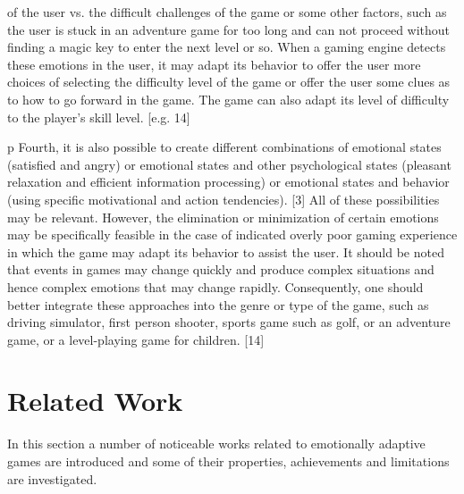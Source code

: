 of the user vs. the difficult challenges of the game or some other factors, such as the user is stuck in an adventure game for too long and can not proceed without finding a magic key to enter the next level or so. When a gaming engine detects these emotions in the user, it may adapt its behavior to offer the user more choices of selecting the difficulty level of the game or offer the user some clues as to how to go forward in the game. The game can also adapt its level of difficulty to the player’s skill level. [e.g. 14] 

p Fourth, it is also possible to create different combinations of emotional states (satisfied and angry) or emotional states and other psychological states (pleasant relaxation and efficient information processing) or emotional states and behavior (using specific motivational and action tendencies). [3]  All of these possibilities may be relevant. However, the elimination or minimization of certain emotions may be specifically feasible in the case of indicated overly poor gaming experience in which the game may adapt its behavior to assist the user. It should be noted that events in games may change quickly and produce complex situations and hence complex emotions that may change rapidly. Consequently, one should better integrate these approaches into the genre or type of the game, such as driving simulator, first person shooter, sports game such as golf, or an adventure game, or a level-playing game for children. [14] 

\section{Related Work}

In this section a number of noticeable works related to emotionally adaptive games are introduced and some of their properties, achievements and limitations are investigated.

